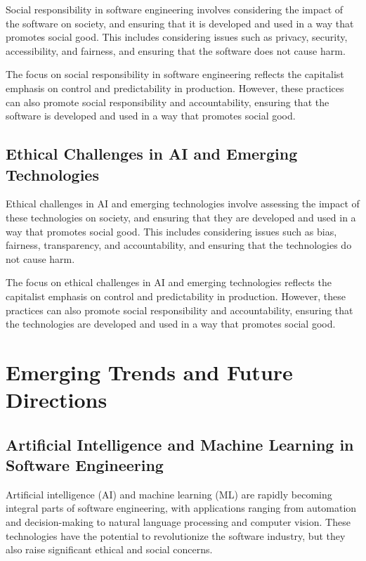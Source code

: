 \begin{refsection}
\begin{multicols}{2}
{Social responsibility in software engineering involves considering the impact of the software on society, and ensuring that it is developed and used in a way that promotes social good. This includes considering issues such as privacy, security, accessibility, and fairness, and ensuring that the software does not cause harm.

The focus on social responsibility in software engineering reflects the capitalist emphasis on control and predictability in production. However, these practices can also promote social responsibility and accountability, ensuring that the software is developed and used in a way that promotes social good.

\subsection{Ethical Challenges in AI and Emerging Technologies}

Ethical challenges in AI and emerging technologies involve assessing the impact of these technologies on society, and ensuring that they are developed and used in a way that promotes social good. This includes considering issues such as bias, fairness, transparency, and accountability, and ensuring that the technologies do not cause harm.

The focus on ethical challenges in AI and emerging technologies reflects the capitalist emphasis on control and predictability in production. However, these practices can also promote social responsibility and accountability, ensuring that the technologies are developed and used in a way that promotes social good.

}
\end{multicols}
\newpage

\section{Emerging Trends and Future Directions}
\begin{multicols}{2}
{\small

\subsection{Artificial Intelligence and Machine Learning in Software Engineering}

Artificial intelligence (AI) and machine learning (ML) are rapidly becoming integral parts of software engineering, with applications ranging from automation and decision-making to natural language processing and computer vision. These technologies have the potential to revolutionize the software industry, but they also raise significant ethical and social concerns.

}
\end{multicols}
\end{refsection}
